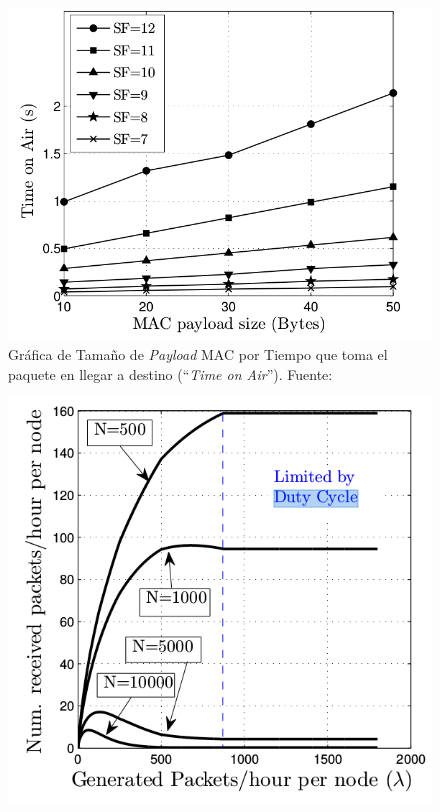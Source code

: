 \begin{justify}
\begin{figure}[!ht]
\centering
\includegraphics[scale=0.4]{images/estadoarte1.png}
\caption{Gráfica de Tamaño de \textit{Payload} MAC por Tiempo que toma el paquete en llegar a destino (``\textit{Time on Air}''). Fuente:\cite{Xavier}}
\label{arte:1}
\end{figure}
\begin{figure}[!ht]
\centering
\includegraphics[scale=0.4]{images/estadoarte2.png}

\end{figure}
\end{justify}
